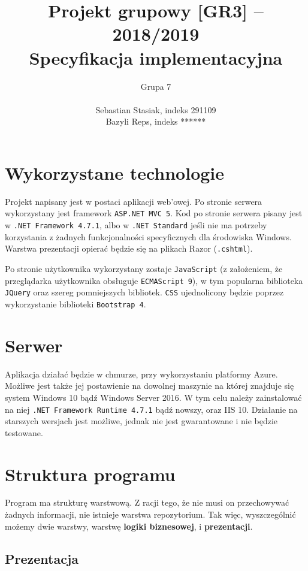 \documentclass[a4paper, 10pt, titlepage]{article}
\title {Projekt grupowy [GR3] -- 2018/2019\\Specyfikacja implementacyjna}
\author{Grupa 7 \\\\ Sebastian Stasiak, indeks 291109 \\ Bazyli Reps, indeks ******}
\newcommand{\code}[1]{\texttt{#1}}
\begin{document}
\maketitle
\tableofcontents
\newpage

\section{Wykorzystane technologie}

Projekt napisany jest w postaci aplikacji web'owej.
Po stronie serwera wykorzystany jest framework \code{ASP.NET MVC 5}. Kod po stronie serwera pisany jest w \code{.NET Framework 4.7.1}, albo w \code{.NET Standard} jeśli nie ma potrzeby korzystania z żadnych funkcjonalności specyficznych dla środowiska Windows.
Warstwa prezentacji opierać będzie się na plikach Razor (\code{.cshtml}).

Po stronie użytkownika wykorzystany zostaje \code{JavaScript} (z założeniem, że przeglądarka użytkownika obsługuje \code{ECMAScript 9}), w tym popularna biblioteka \code{JQuery} oraz szereg pomniejszych bibliotek.
\code{CSS} ujednolicony będzie poprzez wykorzystanie biblioteki \code{Bootstrap 4}.

\section{Serwer}

Aplikacja działać będzie w chmurze, przy wykorzystaniu platformy Azure.
Możliwe jest także jej postawienie na dowolnej maszynie na której znajduje się system Windows 10 bądź Windows Server 2016.
W tym celu należy zainstalować na niej \code{.NET Framework Runtime 4.7.1} bądź nowszy, oraz IIS 10.
Działanie na starszych wersjach jest możliwe, jednak nie jest gwarantowane i nie będzie testowane.

\section{Struktura programu}

Program ma strukturę warstwową.
Z racji tego, że nie musi on przechowywać żadnych informacji, nie istnieje warstwa repozytorium.
Tak więc, wyszczególnić możemy dwie warstwy, warstwę \textbf{logiki biznesowej}, i \textbf{prezentacji}.

\subsection{Prezentacja}
\end{document}
